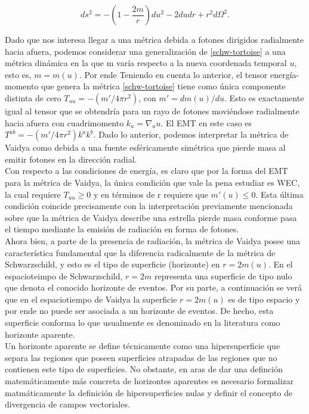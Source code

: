 \documentclass{article}
\numberwithin{equation}{section}
\theoremstyle{definition}
\begin{document}
\begin{equation}
\label{schw-tortoise}
ds^2 = - \left(1- \frac{2m}{r}\right)du^2 - 2dudr + r^2d\Omega^2.
\end{equation}

Dado que nos interesa llegar a una métrica debida a fotones dirigidos radialmente hacia afuera, podemos considerar una generalización de \eqref{schw-tortoise} a una métrica dinámica en la que m varía respecto a la nueva coordenada temporal $u$, esto es, $m = m(u)$. Por ende Teniendo en cuenta lo anterior, el tensor energía-momento que genera la métrica \eqref{schw-tortoise} tiene como única componente distinta de cero $T_{uu} = -(m'/4 \pi r^2)$, con $m' = dm(u)/du$. Esto es exactamente igual al tensor que se obtendría para un rayo de fotones moviéndose radialmente hacia afuera con cuadrimomento $k_{a} = \nabla_{a}u$. El EMT en este caso es $T^{ab} = -(m'/4 \pi r^2)k^{a}k^{b}$. Dado lo anterior, podemos interpretar la métrica de Vaidya como debida a una fuente esféricamente simétrica que pierde masa al emitir fotones en la dirección radial.\\

Con respecto a las condiciones de energía, es claro que por la forma del EMT para la métrica de Vaidya, la única condición que vale la pena estudiar es WEC, la cual requiere $T_{uu} \geq 0$ y en términos de r requiere que $m'(u)\leq 0 $. Esta última condición coincide precisamente con la interpretación previamente mencionada sobre que la métrica de Vaidya describe una estrella pierde masa conforme pasa el tiempo mediante la emisión de radiación en forma de fotones.\\

Ahora bien, a parte de la presencia de radiación, la métrica de Vaidya posee una característica fundamental que la diferencia radicalmente de la métrica de Schwarzschild, y esto es el tipo de superficie (horizonte) en $r = 2m(u)$. En el espacioteimpo de Schwarzschild, $r = 2m$ representa una superficie de tipo nulo que denota el conocido horizonte de eventos. Por su parte, a continuación se verá que en el espaciotiempo de Vaidya la superficie $r = 2m(u)$ es de tipo espacio y por ende no puede ser asociada a un horizonte de eventos. De hecho, esta superficie conforma lo que usualmente es denominado en la literatura \cite{blau,griffiths2009,wald2010} como horizonte aparente.\\


Un horizonte aparente se define técnicamente como una hipersuperficie que separa las regiones que poseen superficies atrapadas de las regiones que no contienen este tipo de superficies. No obstante, en aras de dar una definción matemáticamente más concreta de horizontes aparentes es necesario formalizar matmáticamente la definición de hipersuperficies nulas y definir el concepto de divergencia de campos vectoriales.\\
\end{document}
